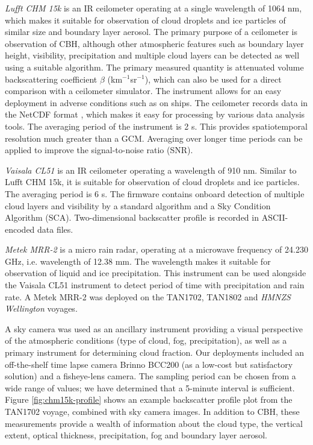 \textit{Lufft CHM 15k} is an IR ceilometer operating at a single wavelength of
1064 nm, which makes it suitable for observation of cloud droplets and
ice particles of similar size and boundary layer aerosol.
The primary purpose of a ceilometer
is observation of CBH, although other atmospheric features
such as boundary layer height, visibility, precipitation and multiple
cloud layers can be detected as well using a suitable algorithm. The
primary measured quantity is attenuated volume backscattering coefficient
$\beta$ (km$^{-1}$sr$^{-1}$), which
can also be used for a direct comparison with a ceilometer simulator.
The instrument allows for an easy deployment
in adverse conditions such as on ships.
The ceilometer records data in the NetCDF format \citep{rew2006},
which makes it easy
for processing by various data analysis tools.
The averaging period of the instrument is 2 s. This provides spatiotemporal
resolution much greater than a GCM. Averaging over longer time periods can
be applied to improve the signal-to-noise ratio (SNR).

\textit{Vaisala CL51} is an IR ceilometer operating a
wavelength of 910 nm. Similar to Lufft CHM 15k, it is suitable for observation
of cloud droplets and ice particles. The averaging period is 6 s.
The firmware contains onboard detection of multiple cloud layers and
visibility by a standard algorithm and a Sky Condition Algorithm (SCA).
Two-dimensional backscatter profile is recorded in ASCII-encoded data files.

\textit{Metek MRR-2} is a micro rain radar, operating at a microwave frequency of
24.230 GHz, i.e. wavelength of 12.38 mm. The wavelength makes it suitable
for observation of liquid and ice precipitation. This instrument can
be used alongside the Vaisala CL51 instrument to detect period of time with
precipitation and rain rate. A Metek MRR-2 was deployed on the TAN1702, TAN1802
and \textit{HMNZS Wellington} voyages.

A sky camera was used as an ancillary instrument providing a visual
perspective of the atmospheric conditions (type of cloud, fog,
precipitation), as well as a primary instrument for determining cloud fraction.
Our deployments included
an off-the-shelf time lapse camera Brinno BCC200 (as a low-cost but
satisfactory solution) and a fisheye-lens camera.
The sampling period can be chosen from a wide range of values; we have
determined that a 5-minute interval is sufficient.
Figure \ref{fig:chm15k-profile} shows an example backscatter profile plot
from the TAN1702 voyage, combined with sky camera images. 
In addition to CBH, these measurements provide a wealth
of information about the cloud type, the vertical extent, optical thickness,
precipitation, fog and boundary layer aerosol.

